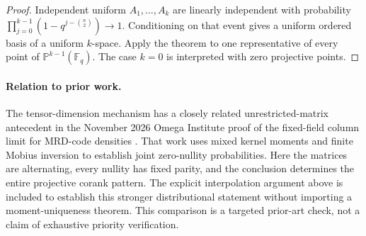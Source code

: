 \begin{proof}
Independent uniform $A_1,\ldots,A_k$ are linearly independent with
probability $\prod_{j=0}^{k-1}(1-q^{j-\binom n2})\to1$. Conditioning on
that event gives a uniform ordered basis of a uniform $k$-space. Apply
the theorem to one representative of every point of
$\mathbb P^{k-1}(\mathbb F_q)$. The case $k=0$ is interpreted with zero
projective points.
\end{proof}

\paragraph{Relation to prior work.}
The tensor-dimension mechanism has a closely related unrestricted-matrix
antecedent in the November 2026 Omega Institute proof of the fixed-field
column limit for MRD-code densities \cite{OmegaMRD2026}. That work uses mixed kernel moments
and finite Mobius inversion to establish joint zero-nullity probabilities.
Here the matrices are alternating, every nullity has fixed parity, and
the conclusion determines the entire projective corank pattern. The
explicit interpolation argument above is included to establish this
stronger distributional statement without importing a moment-uniqueness
theorem. This comparison is a targeted prior-art check, not a claim of
exhaustive priority verification.

